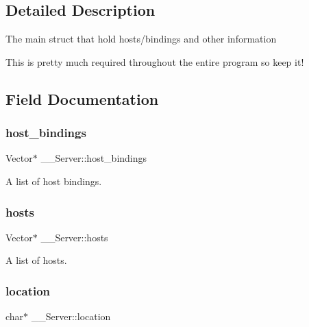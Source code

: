 \subsection{Detailed Description}
The main struct that hold hosts/bindings and other information

This is pretty much required throughout the entire program so keep it! 

\subsection{Field Documentation}
\mbox{\label{struct_____server_a389d7a5fe24d9711632aabfed1c37ae3}} 
\subsubsection{\texorpdfstring{host\+\_\+bindings}{host\_bindings}}
{\footnotesize\ttfamily Vector$\ast$ \+\_\+\+\_\+\+Server\+::host\+\_\+bindings}



A list of host bindings. 

\mbox{\label{struct_____server_aa3be8ce9854d670e8d998ed3447d95ee}} 
\subsubsection{\texorpdfstring{hosts}{hosts}}
{\footnotesize\ttfamily Vector$\ast$ \+\_\+\+\_\+\+Server\+::hosts}



A list of hosts. 

\mbox{\label{struct_____server_a34c1fd64941cff2faede91f79ebee8ec}} 
\subsubsection{\texorpdfstring{location}{location}}
{\footnotesize\ttfamily char$\ast$ \+\_\+\+\_\+\+Server\+::location}



